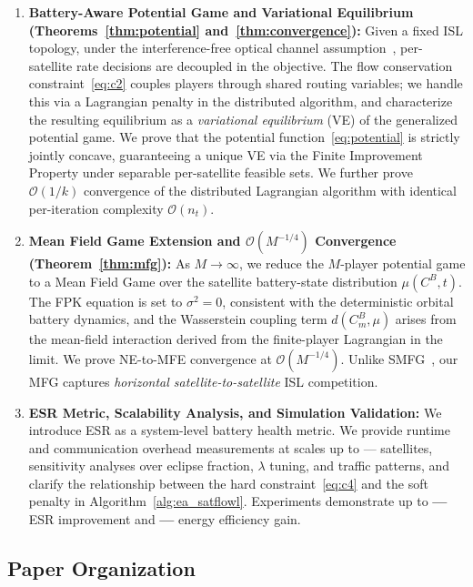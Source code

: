 \documentclass[journal]{IEEEtran}
\newcommand{\CB}{C^{B}}
\begin{document}
\begin{enumerate}
\item \textbf{Battery-Aware Potential Game and
Variational Equilibrium (Theorems~\ref{thm:potential} and~\ref{thm:convergence}):} Given a fixed ISL topology, under the interference-free optical channel assumption~\cite{maac,deepisl}, per-satellite rate decisions are decoupled in the objective. The flow conservation constraint~\eqref{eq:c2} couples players through shared routing variables; we handle this via a Lagrangian penalty in the distributed algorithm, and characterize the resulting equilibrium as a \emph{variational equilibrium} (VE) of the generalized potential game. We prove that the potential function~\eqref{eq:potential} is strictly jointly concave, guaranteeing a unique VE via the Finite Improvement Property under separable per-satellite feasible sets. We further prove $\mathcal{O}(1/k)$ convergence of the distributed Lagrangian algorithm with identical per-iteration complexity $\mathcal{O}(n_t)$.

\item \textbf{Mean Field Game Extension and
$\mathcal{O}(M^{-1/4})$ Convergence (Theorem~\ref{thm:mfg}):} As $M\to\infty$, we reduce the $M$-player potential game to a Mean Field Game over the satellite battery-state distribution $\mu(\CB,t)$. The FPK equation is set to $\sigma^2=0$, consistent with the deterministic orbital battery dynamics, and the Wasserstein coupling term $d(\CB_m,\mu)$ arises from the mean-field interaction derived from the finite-player Lagrangian in the limit. We prove NE-to-MFE convergence at $\mathcal{O}(M^{-1/4})$. Unlike SMFG~\cite{wang2023smfg}, our MFG captures
\emph{horizontal satellite-to-satellite} ISL
competition.

\item \textbf{ESR Metric, Scalability Analysis,
and Simulation Validation:} We introduce ESR as a system-level battery health metric. We provide runtime and communication overhead measurements at scales up to --- satellites, sensitivity analyses over eclipse fraction, $\lambda$ tuning, and traffic patterns, and clarify the relationship between the hard constraint~\eqref{eq:c4} and the soft penalty in Algorithm~\ref{alg:ea_satflowl}. Experiments demonstrate up to \textbf{---} ESR improvement and \textbf{---} energy efficiency gain.

\end{enumerate}

\subsection{Paper Organization}
\end{document}
